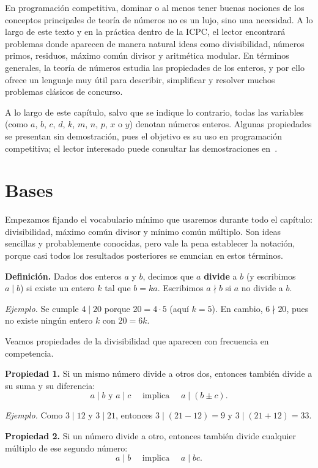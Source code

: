 En programación competitiva, dominar o al menos tener buenas nociones de los conceptos principales de teoría de números no es un lujo, sino una necesidad. A lo largo de este texto y en la práctica dentro de la ICPC, el lector encontrará problemas donde aparecen de manera natural ideas como divisibilidad, números primos, residuos, máximo común divisor y aritmética modular. En términos generales, la teoría de números estudia las propiedades de los enteros, y por ello ofrece un lenguaje muy útil para describir, simplificar y resolver muchos problemas clásicos de concurso.

A lo largo de este capítulo, salvo que se indique lo contrario, todas las variables (como $a$, $b$, $c$, $d$, $k$, $m$, $n$, $p$, $x$ o $y$) denotan números enteros. Algunas propiedades se presentan sin demostración, pues el objetivo es su uso en programación competitiva; el lector interesado puede consultar las demostraciones en~\cite{perez_numeros}.
\section{Bases}

Empezamos fijando el vocabulario mínimo que usaremos durante todo el capítulo: divisibilidad, máximo común divisor y mínimo común múltiplo. Son ideas sencillas y probablemente conocidas, pero vale la pena establecer la notación, porque casi todos los resultados posteriores se enuncian en estos términos.

\textbf{Definición.} Dados dos enteros $a$ y $b$, decimos que $a$ \textbf{divide} a $b$ (y escribimos $a \mid b$) si existe un entero $k$ tal que $b = ka$. Escribimos $a \nmid b$ si $a$ no divide a $b$.

\textit{Ejemplo.} Se cumple $4 \mid 20$ porque $20 = 4 \cdot 5$ (aquí $k = 5$). En cambio, $6 \nmid 20$, pues no existe ningún entero $k$ con $20 = 6k$.

Veamos propiedades de la divisibilidad que aparecen con frecuencia en competencia.

\textbf{Propiedad 1.} Si un mismo número divide a otros dos, entonces también divide a su suma y su diferencia:
\[
a \mid b \text{  y  } a \mid c \quad \text{ implica } \quad a \mid (b \pm c).
\]

\textit{Ejemplo.} Como $3 \mid 12$ y $3 \mid 21$, entonces $3 \mid (21-12) = 9$ y $3 \mid (21+12) = 33$.

\textbf{Propiedad 2.} Si un número divide a otro, entonces también divide cualquier múltiplo de ese segundo número:
\[
a \mid b \quad \text{ implica } \quad a \mid bc.
\]

